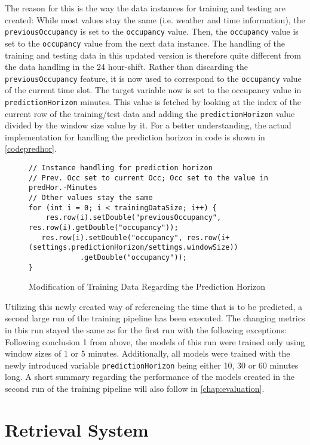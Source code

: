 The reason for this is the way the data instances for training and testing are created: While most values stay the same (i.e. weather and time information), the \texttt{previousOccupancy} is set to the \texttt{occupancy} value. Then, the \texttt{occupancy} value is set to the \texttt{occupancy} value from the next data instance. The handling of the training and testing data in this updated version is therefore quite different from the data handling in the 24 hour-shift. Rather than discarding the \texttt{previousOccupancy} feature, it is now used to correspond to the \texttt{occupancy} value of the current time slot. The target variable now is set to the occupancy value in \texttt{predictionHorizon} minutes. This value is fetched by looking at the index of the current row of the training/test data and adding the \texttt{predictionHorizon} value divided by the window size value by it. For a better understanding, the actual implementation for handling the prediction horizon in code is shown in \autoref{codepredhor}.


\begin{figure}
\begin{lstlisting}
// Instance handling for prediction horizon
// Prev. Occ set to current Occ; Occ set to the value in predHor.-Minutes 
// Other values stay the same
for (int i = 0; i < trainingDataSize; i++) {
	res.row(i).setDouble("previousOccupancy", res.row(i).getDouble("occupancy"));
   res.row(i).setDouble("occupancy", res.row(i+(settings.predictionHorizon/settings.windowSize))
            .getDouble("occupancy"));
}
\end{lstlisting}
\caption{Modification of Training Data Regarding the Prediction Horizon}
\label{codepredhor}
\end{figure}


Utilizing this newly created way of referencing the time that is to be predicted, a second large run of the training pipeline has been executed. The changing metrics in this run stayed the same as for the first run with the following exceptions: Following conclusion 1 from above, the models of this run were trained only using window sizes of 1 or 5 minutes. Additionally, all models were trained with the newly introduced variable \texttt{predictionHorizon} being either 10, 30 or 60 minutes long. A short summary regarding the performance of the models created in the second run of the training pipeline will also follow in \autoref{chap:evaluation}.



\section{Retrieval System}
 
